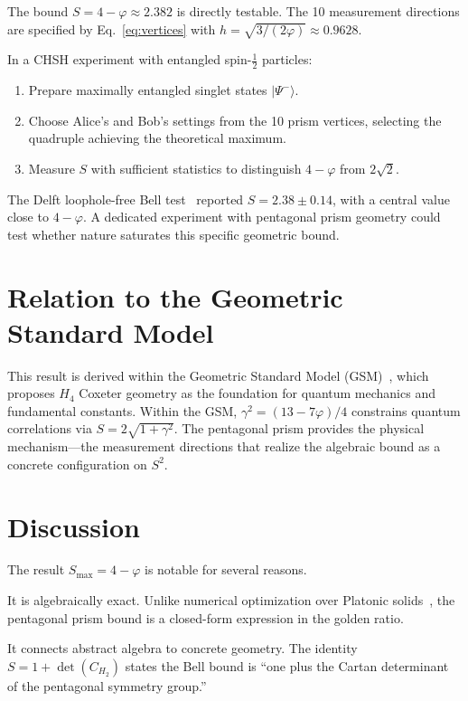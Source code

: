 \documentclass[12pt,a4paper]{article}
\newcommand{\vp}{\varphi}
\newcommand{\Smax}{S_{\max}}
\newcommand{\detC}[1]{\det(C_{#1})}
\begin{document}
The bound $S = 4 - \vp \approx 2.382$ is directly testable. The 10 
measurement directions are specified by Eq.~\eqref{eq:vertices} with 
$h = \sqrt{3/(2\vp)} \approx 0.9628$.

In a CHSH experiment with entangled spin-$\frac{1}{2}$ particles:
\begin{enumerate}
\item Prepare maximally entangled singlet states $|\Psi^-\rangle$.
\item Choose Alice's and Bob's settings from the 10 prism vertices, 
      selecting the quadruple achieving the theoretical maximum.
\item Measure $S$ with sufficient statistics to distinguish $4 - \vp$ 
      from $2\sqrt{2}$.
\end{enumerate}

The Delft loophole-free Bell test~\cite{hensen2015} reported 
$S = 2.38 \pm 0.14$, with a central value close to $4-\vp$. 
A dedicated experiment with pentagonal prism geometry could test 
whether nature saturates this specific geometric bound.

\section{Relation to the Geometric Standard Model}
\label{sec:gsm}

This result is derived within the Geometric Standard Model 
(GSM)~\cite{mcgirl2025gsm}, which proposes $H_4$ Coxeter geometry 
as the foundation for quantum mechanics and fundamental constants.
Within the GSM, $\gamma^2 = (13 - 7\vp)/4$ constrains quantum 
correlations via $S = 2\sqrt{1+\gamma^2}$. The pentagonal prism 
provides the physical mechanism---the measurement directions that 
realize the algebraic bound as a concrete configuration on $S^2$.

\section{Discussion}
\label{sec:discussion}

The result $\Smax = 4 - \vp$ is notable for several reasons.

It is algebraically exact. Unlike numerical optimization over Platonic 
solids~\cite{tavakoli2020}, the pentagonal prism bound is a closed-form 
expression in the golden ratio.

It connects abstract algebra to concrete geometry. The identity 
$S = 1 + \detC{H_2}$ states the Bell bound is ``one plus the Cartan 
determinant of the pentagonal symmetry group.''
\end{document}
